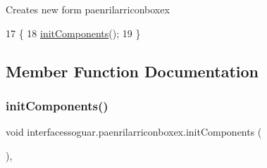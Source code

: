 Creates new form paenrilarriconboxex 
\begin{DoxyCode}
17                                  \{
18         \mbox{\hyperlink{classinterfacessoguar_1_1paenrilarriconboxex_a78ad00ab639eb66f84b15092487d2917}{initComponents}}();
19     \}
\end{DoxyCode}


\subsection{Member Function Documentation}
\mbox{\label{classinterfacessoguar_1_1paenrilarriconboxex_a78ad00ab639eb66f84b15092487d2917}} 
\subsubsection{\texorpdfstring{init\+Components()}{initComponents()}}
{\footnotesize\ttfamily void interfacessoguar.\+paenrilarriconboxex.\+init\+Components (\begin{DoxyParamCaption}{ }\end{DoxyParamCaption})\hspace{0.3cm}{\ttfamily [inline]}, {\ttfamily [private]}}

